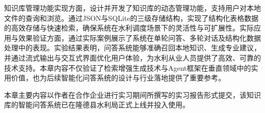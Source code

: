 知识库管理功能实现方面，设计并开发了知识库的动态管理功能，支持用户对本地文件的查询和浏览。通过JSON与SQLite的三级存储结构，实现了结构化表格数据的高效存储与快速检索，确保系统在水利调度场景下的灵活性与可扩展性。实际应用与效果验证方面，通过实际案例展示了系统在单轮问答、多轮对话及结构化数据处理中的表现。实验结果表明，问答系统能够准确召回本地知识、生成专业建议，并通过流式输出与交互式界面优化用户体验，为水利从业人员提供了高效、可靠的技术支持。本章内容不仅验证了检索增强生成技术与Agent框架在垂直领域中的实用价值，也为后续智能化问答系统的设计与行业落地提供了重要参考。

本章主要内容以作者在合作企业进行实习期间所撰写的实习报告形式提交，该知识库的智能问答系统已在隆德县水利局正式上线并投入使用。
